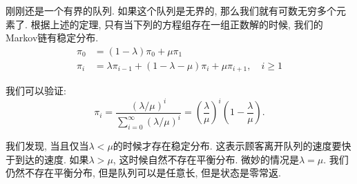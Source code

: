 \begin{example}
    刚刚还是一个有界的队列. 如果这个队列是无界的, 那么我们就有可数无穷多个元素了. 根据上述的定理, 只有当下列的方程组存在一组正数解的时候, 我们的Markov链有稳定分布. 
    $$\begin{aligned} \pi_0 & =(1-\lambda) \pi_0+\mu \pi_1 \\ \pi_i & =\lambda \pi_{i-1}+(1-\lambda-\mu) \pi_i+\mu \pi_{i+1}, \quad i \geq 1\end{aligned}$$

    我们可以验证: $$\pi_i=\frac{(\lambda / \mu)^i}{\sum_{i=0}^{\infty}(\lambda / \mu)^i}=\left(\frac{\lambda}{\mu}\right)^i\left(1-\frac{\lambda}{\mu}\right).$$

    我们发现, 当且仅当$\lambda < \mu$的时候才存在稳定分布. 这表示顾客离开队列的速度要快于到达的速度. 如果$\lambda > \mu$, 这时候自然不存在平衡分布. 微妙的情况是$\lambda = \mu$. 我们仍然不存在平衡分布, 但是队列可以是任意长, 但是状态是零常返. 

\end{example}